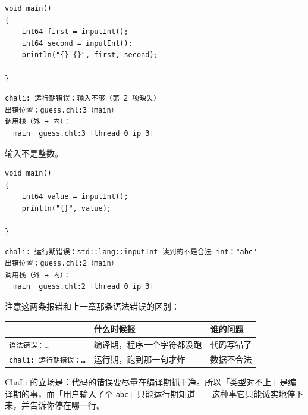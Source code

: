 \par
\medskip
\begin{lstlisting}[style=chali]
void main()
{
    int64 first = inputInt();
    int64 second = inputInt();
    println("{} {}", first, second);

}
\end{lstlisting}
\par
\medskip

\par
\medskip
\begin{lstlisting}[style=out]
chali: 运行期错误：输入不够（第 2 项缺失）
出错位置：guess.chl:3（main）
调用栈（外 → 内）：
  main  guess.chl:3 [thread 0 ip 3]
\end{lstlisting}
\par
\medskip

输入不是整数。

\par
\medskip
\begin{lstlisting}[style=chali]
void main()
{
    int64 value = inputInt();
    println("{}", value);

}
\end{lstlisting}
\par
\medskip

\par
\medskip
\begin{lstlisting}[style=out]
chali: 运行期错误：std::lang::inputInt 读到的不是合法 int："abc"
出错位置：guess.chl:2（main）
调用栈（外 → 内）：
  main  guess.chl:2 [thread 0 ip 3]
\end{lstlisting}
\par
\medskip

注意这两条报错和上一章那条语法错误的区别：

\begin{center}
\begin{tabular}{lll}
\toprule
 & 什么时候报 & 谁的问题 \\
\midrule
\texttt{语法错误：…} & 编译期，程序一个字符都没跑 & 代码写错了 \\
\texttt{chali:\allowbreak{} 运行期错误：…} & 运行期，跑到那一句才炸 & 数据不合法 \\
\bottomrule
\end{tabular}
\end{center}

ChaLi 的立场是：代码的错误要尽量在编译期抓干净。所以「类型对不上」是编译期的事，而「用户输入了个 \texttt{abc}」只能运行期知道——这种事它只能诚实地停下来，并告诉你停在哪一行。

